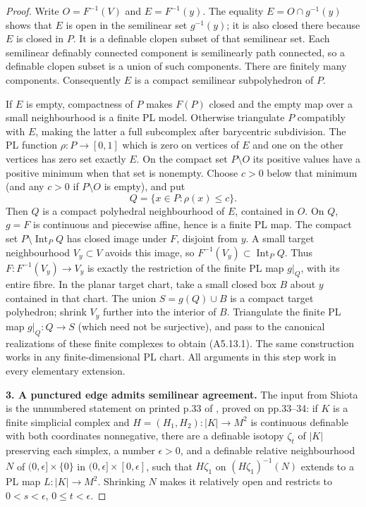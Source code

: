 \begin{proof}
Write $O=F^{-1}(V)$ and $E=F^{-1}(y)$.  The equality
$E=O\cap g^{-1}(y)$ shows that $E$ is open in the semilinear set
$g^{-1}(y)$; it is also closed there because $E$ is closed in $P$.
It is a definable clopen subset of that semilinear set.  Each
semilinear definably connected component is semilinearly path connected,
so a definable clopen subset is a union of such components.
There are finitely many components.  Consequently $E$ is a
compact semilinear subpolyhedron of $P$.

If $E$ is empty, compactness of $P$ makes $F(P)$ closed and the
empty map over a small neighbourhood is a finite PL model.
Otherwise triangulate $P$ compatibly with $E$, making the latter
a full subcomplex after barycentric subdivision.  The PL function
$\rho:P\to[0,1]$ which is zero on vertices of $E$ and one on the
other vertices has zero set exactly $E$.  On the compact set
$P\setminus O$ its positive values have a positive minimum when
that set is nonempty.  Choose $c>0$ below that minimum (and any
$c>0$ if $P\setminus O$ is empty), and put
\[
                     Q=\{x\in P:\rho(x)\leq c\}.
\]
Then $Q$ is a compact polyhedral neighbourhood of $E$, contained
in $O$.  On $Q$, $g=F$ is continuous and piecewise affine, hence
is a finite PL map.  The compact set $P\setminus\operatorname{Int}_P Q$
has closed image under $F$, disjoint from $y$.  A small target
neighbourhood $V_y\subset V$ avoids this image, so
$F^{-1}(V_y)\subset\operatorname{Int}_P Q$.  Thus
$F:F^{-1}(V_y)\to V_y$ is exactly the restriction of the finite
PL map $g|_Q$, with its entire fibre.  In the planar target chart,
take a small closed box $B$ about $y$ contained in that chart.
The union $S=g(Q)\cup B$ is a compact target polyhedron; shrink
$V_y$ further into the interior of $B$.  Triangulate the finite
PL map $g|_Q:Q\to S$ (which need not be surjective), and pass
to the canonical realizations of these finite complexes to obtain
(A5.13.1).  The same construction works in any finite-dimensional
PL chart.  All arguments in this step work in every elementary
extension.

\medskip\noindent\textbf{3. A punctured edge admits semilinear agreement.}
The input from Shiota is the unnumbered statement on printed p.33
of \cite{A5-Shiota}, proved on pp.33--34: if $K$ is a finite
simplicial complex and
$H=(H_1,H_2):|K|\to M^2$ is continuous definable with both
coordinates nonnegative, there are a definable isotopy $\zeta_t$
of $|K|$ preserving each simplex, a number $\epsilon>0$, and a
definable relative neighbourhood $N$ of
$(0,\epsilon]\times\{0\}$ in
$(0,\epsilon]\times[0,\epsilon]$, such that
$H\zeta_1$ on $(H\zeta_1)^{-1}(N)$ extends to a PL map
$L:|K|\to M^2$.  Shrinking $N$ makes it relatively open and
restricts to $0<s<\epsilon$, $0\leq t<\epsilon$.


\end{proof}
